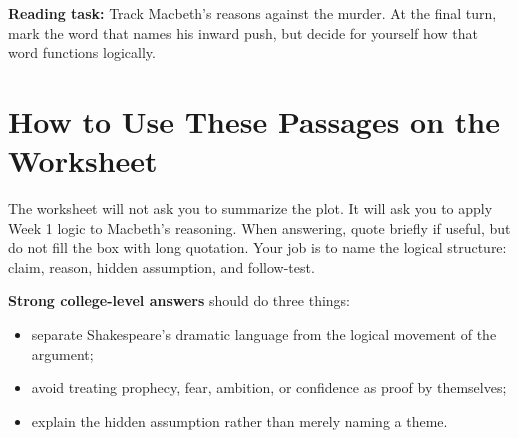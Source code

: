 \documentclass[12pt]{article}
\begin{document}
\textbf{Reading task:} Track Macbeth's reasons against the murder. At the final turn, mark the word that names his inward push, but decide for yourself how that word functions logically.

\section*{How to Use These Passages on the Worksheet}

The worksheet will not ask you to summarize the plot. It will ask you to apply Week 1 logic to Macbeth's reasoning. When answering, quote briefly if useful, but do not fill the box with long quotation. Your job is to name the logical structure: claim, reason, hidden assumption, and follow-test.

\textbf{Strong college-level answers} should do three things:

\begin{itemize}[leftmargin=1.5em,itemsep=0.2em]
\item separate Shakespeare's dramatic language from the logical movement of the argument;
\item avoid treating prophecy, fear, ambition, or confidence as proof by themselves;
\item explain the hidden assumption rather than merely naming a theme.
\end{itemize}
\end{document}
